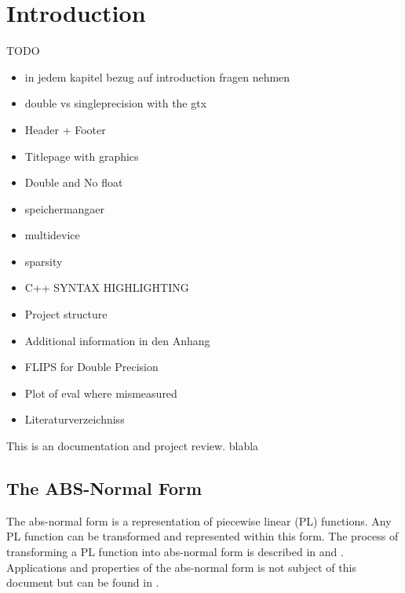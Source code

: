 \section{Introduction}
TODO
\begin{itemize}
	\item in jedem kapitel bezug auf introduction fragen nehmen
	\item double vs singleprecision with the gtx
	\item Header + Footer
	\item Titlepage with graphics
	\item Double and No float
	\item speichermangaer
	\item multidevice
	\item sparsity
	\item C++ SYNTAX HIGHLIGHTING
	\item Project structure
	\item Additional information in den Anhang
	\item FLIPS for Double Precision
	\item Plot of eval where mismeasured
	\item Literaturverzeichniss
\end{itemize}


This is an documentation and project review. blabla

\subsection{The ABS-Normal Form}
The abs-normal form is a representation of piecewise linear (PL) functions. Any PL function can be transformed and represented within this form. The process of transforming a PL function into abs-normal form is described in \cite{Griewank2013} and \cite{Griewank2017}. Applications and properties of the abs-normal form is not subject of this document but can be found in \cite{Griewank2017}.

